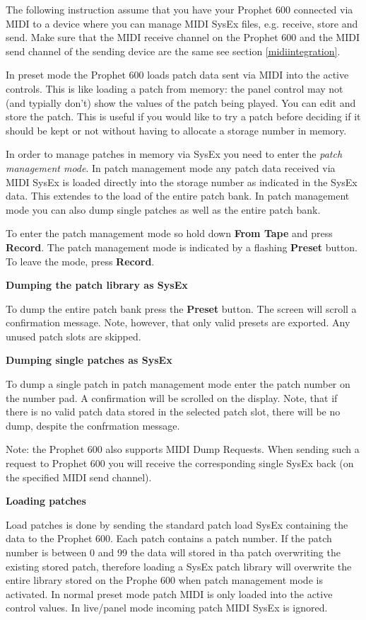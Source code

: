 
The following instruction assume that you have your Prophet 600 connected via MIDI to a device where you can manage MIDI SysEx files, e.g. receive, store and send. Make sure that the MIDI receive channel on the Prophet 600 and the MIDI send channel of the sending device are the same see section \ref{midiintegration}.

In preset mode the Prophet 600 loads patch data sent via MIDI into the active controls. This is like loading a patch from memory: the panel control may not (and typially don't) show the values of the patch being played. You can edit and store the patch. This is useful if you would like to try a patch before deciding if it should be kept or not without having to allocate a storage number in memory. 

In order to manage patches in memory via SysEx you need to enter the \textit{patch management mode}. In patch management mode any patch data received via MIDI SysEx is loaded directly into the storage number as indicated in the SysEx data. This extendes to the load of the entire patch bank. In patch management mode you can also dump single patches as well as the entire patch bank.

To enter the patch management mode so hold down \textbf{From Tape} and press \textbf{Record}. The patch management mode is indicated by a flashing \textbf{Preset} button. To leave the mode, press \textbf{Record}. 

\textbf{Dumping the patch library as SysEx} 

To dump the entire patch bank press the \textbf{Preset} button. The screen will scroll a confirmation message. Note, however, that only valid presets are exported. Any unused patch slots are skipped.

\textbf{Dumping single patches as SysEx} 

To dump a single patch in patch management mode enter the patch number on the number pad. A confirmation will be scrolled on the display. Note, that if there is no valid patch data stored in the selected patch slot, there will be no dump, despite the confrmation message.

Note: the Prophet 600 also supports MIDI Dump Requests. When sending such a request to Prophet 600 you will receive the corresponding single SysEx back (on the specified MIDI send channel). 

\textbf{Loading patches} 

Load patches is done by sending the standard patch load SysEx containing the data to the Prophet 600. Each patch contains a patch number. If the patch number is  between 0 and 99 the data will stored in tha patch overwriting the existing stored patch, therefore loading a SysEx patch library will overwrite the entire library stored on the Prophe 600 when patch management mode is activated. In normal preset mode patch MIDI is only loaded into the active control values. In live/panel mode incoming patch MIDI SysEx is ignored.
